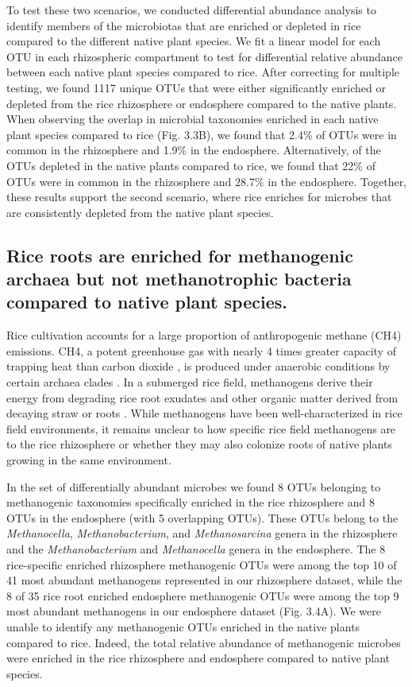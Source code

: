 To test these two scenarios, we conducted differential abundance analysis to identify members of the microbiotas that are enriched or depleted in rice compared to the different native plant species. We fit a linear model for each OTU in each rhizospheric compartment to test for differential relative abundance between each native plant species compared to rice. After correcting for multiple testing, we found 1117 unique OTUs that were either significantly enriched or depleted from the rice rhizosphere or endosphere compared to the native plants. When observing the overlap in microbial taxonomies enriched in each native plant species compared to rice (Fig. 3.3B), we found that 2.4\% of OTUs were in common in the rhizosphere and 1.9\% in the endosphere. Alternatively, of the OTUs depleted in the native plants compared to rice, we found that 22\% of OTUs were in common in the rhizosphere and 28.7\% in the endosphere. Together, these results support the second scenario, where rice enriches for microbes that are consistently depleted from the native plant species. 

\subsection{Rice roots are enriched for methanogenic archaea but not methanotrophic bacteria compared to native plant species.}
Rice cultivation accounts for a large proportion of anthropogenic methane (CH4) emissions. CH4, a potent greenhouse gas with nearly 4 times greater capacity of trapping heat than carbon dioxide \cite{lashof1990relative}, is produced under anaerobic conditions by certain archaea clades \cite{Minami1994}. In a submerged rice field, methanogens derive their energy from degrading rice root exudates and other organic matter derived from decaying straw or roots \cite{Minami1994}. While methanogens have been well-characterized in rice field environments, it remains unclear to how specific rice field methanogens are to the rice rhizosphere or whether they may also colonize roots of native plants growing in the same environment.

In the set of differentially abundant microbes we found 8 OTUs belonging to methanogenic taxonomies specifically enriched in the rice rhizosphere and 8 OTUs in the endosphere (with 5 overlapping OTUs). These OTUs belong to the \textit{Methanocella}, \textit{Methanobacterium}, and \textit{Methanosarcina} genera in the rhizosphere and the \textit{Methanobacterium} and \textit{Methanocella} genera in the endosphere. The 8 rice-specific enriched rhizosphere methanogenic OTUs were among the top 10 of 41 most abundant methanogens represented in our rhizosphere dataset, while the 8 of 35 rice root enriched endosphere methanogenic OTUs were among the top 9 most abundant methanogens in our endosphere dataset (Fig. 3.4A). We were unable to identify any methanogenic OTUs enriched in the native plants compared to rice. Indeed, the total relative abundance of methanogenic microbes were enriched in the rice rhizosphere and endosphere compared to native plant species.

